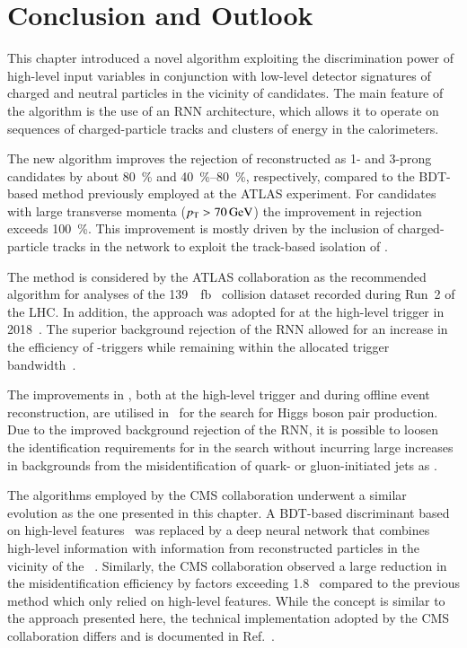 \section{Conclusion and Outlook}%
\label{sec:tauid_conclusion}

This chapter introduced a novel \tauid algorithm exploiting the discrimination
power of high-level input variables in conjunction with low-level detector
signatures of charged and neutral particles in the vicinity of \tauhadvis
candidates. The main feature of the algorithm is the use of an RNN architecture,
which allows it to operate on sequences of charged-particle tracks and clusters
of energy in the calorimeters.

The new algorithm improves the rejection of \faketauhadvis
reconstructed as 1- and 3-prong \tauhadvis candidates by about
\SI{80}{\percent} and \SIrange{40}{80}{\percent}, respectively,
compared to the BDT-based method previously employed at the ATLAS
experiment. For \tauhadvis candidates with large transverse momenta
($\pT > \SI{70}{\GeV}$) the improvement in \faketauhadvis rejection
exceeds \SI{100}{\percent}. This improvement is mostly driven by the
inclusion of charged-particle tracks in the network to exploit the
track-based isolation of \tauhadvis.

The method is considered by the ATLAS collaboration as the recommended \tauid
algorithm for analyses of the \SI{139}{\per\femto\barn} \pp~collision dataset
recorded during Run~2 of the LHC. In addition, the approach was adopted for
\tauid at the high-level trigger in 2018~\cite{ATL-DAQ-PUB-2019-001}. The
superior background rejection of the RNN \tauid allowed for an increase in the
efficiency of \tauhadvis-triggers while remaining within the allocated trigger
bandwidth~\cite{ATL-DAQ-PUB-2019-001}.

The improvements in \tauid, both at the high-level trigger and during offline
event reconstruction, are utilised in~ for the search for
Higgs boson pair production. Due to the improved background rejection of the
RNN, it is possible to loosen the identification requirements for \tauhadvis in
the search without incurring large increases in backgrounds from the
misidentification of quark- or gluon-initiated jets as \tauhadvis.

The \tauid algorithms employed by the CMS collaboration underwent a
similar evolution as the one presented in this chapter. A BDT-based
discriminant based on high-level features~\cite{CMS-TAU-16-003} was
replaced by a deep neural network that combines high-level information
with information from reconstructed particles in the vicinity of the
\tauhadvis~\cite{CMS-TAU-20-001}. Similarly, the CMS collaboration
observed a large reduction in the \faketauhadvis misidentification
efficiency by factors exceeding 1.8~\cite{CMS-TAU-20-001} compared to
the previous method which only relied on high-level features. While
the concept is similar to the approach presented here, the technical
implementation adopted by the CMS collaboration differs and is
documented in Ref.~\cite{CMS-TAU-20-001}.

